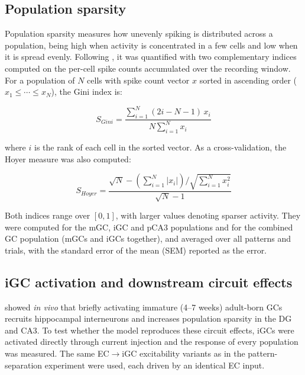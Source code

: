 \documentclass[pdflatex,sn-basic]{sn-jnl}%
\theoremstyle{thmstyleone}%
\theoremstyle{thmstyletwo}%
\theoremstyle{thmstylethree}%
\begin{document}
\subsection{Population sparsity}\label{sec:population_sparsity}

Population sparsity measures how unevenly spiking is distributed across a population, being high when activity is concentrated in
a few cells and low when it is spread evenly. Following \citet{mchughAdultborn2022}, it was quantified with two complementary
indices computed on the per-cell spike counts accumulated over the recording window. For a population of $N$ cells with spike
count vector $x$ sorted in ascending order ($x_1 \leq \cdots \leq x_N$), the Gini index \citep{giniMeasurement1921} is:

\begin{equation}
    \label{eq:gini}
    S_{Gini} = \frac{\sum_{i=1}^{N} (2i - N - 1)\, x_i}{N \sum_{i=1}^{N} x_i}
\end{equation}

where $i$ is the rank of each cell in the sorted vector. As a cross-validation, the Hoyer measure \citep{hoyerNonnegative2004} was
also computed:

\begin{equation}
    \label{eq:hoyer}
    S_{Hoyer} = \frac{\sqrt{N} - \left(\sum_{i=1}^{N} |x_i|\right) \big/ \sqrt{\sum_{i=1}^{N} x_i^2}}{\sqrt{N} - 1}
\end{equation}

Both indices range over $[0, 1]$, with larger values denoting sparser activity. They were computed for the mGC, iGC and pCA3
populations and for the combined GC population (mGCs and iGCs together), and averaged over all patterns and trials, with
the standard error of the mean (SEM) reported as the error.

\subsection{iGC activation and downstream circuit effects}\label{sec:igc_activation}

\citet{mchughAdultborn2022} showed \textit{in vivo} that briefly activating immature (4--7 weeks) adult-born GCs recruits
hippocampal interneurons and increases population sparsity in the DG and CA3. To test whether the model reproduces these circuit
effects, iGCs were activated directly through current injection and the response of every population was measured. The same
EC$\to$iGC excitability variants as in the pattern-separation experiment were used, each driven by an identical EC input.
\end{document}
